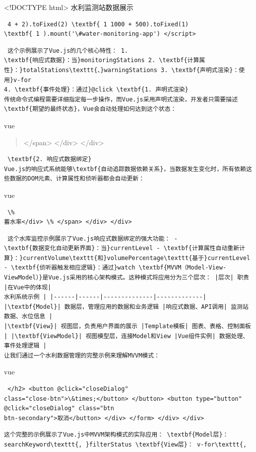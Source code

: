 \textless!DOCTYPE html\textgreater{} 水利监测站数据展示 \begin{verbatim} 4 + 2).toFixed(2) \textbf{ 1 1000 + 500).toFixed(1)
\textbf{ 1 ).mount('\#water-monitoring-app') </script> \end{verbatim} \begin{lstlisting} 这个示例展示了Vue.js的几个核心特性： 1.
\textbf{响应式数据}：当}monitoringStations 2. \textbf{计算属性}：}totalStations\texttt{、}warningStations 3. \textbf{声明式渲染}：使用}v-for
4. \textbf{事件处理}：通过}@click \textbf{1. 声明式渲染}
传统命令式编程需要详细指定每一步操作，而Vue.js采用声明式渲染，开发者只需要描述\textbf{期望的最终状态}，Vue会自动处理如何达到这个状态： \end{lstlisting} vue \begin{quote}

</span> </div> </div> 
\end{quote} \begin{lstlisting} \textbf{2. 响应式数据绑定}
Vue.js的响应式系统能够\textbf{自动追踪数据依赖关系}，当数据发生变化时，所有依赖这些数据的DOM元素、计算属性和侦听器都会自动更新： \end{lstlisting} vue \begin{verbatim} \%
蓄水率</div> \% </span> </div> </div> \end{verbatim} \begin{lstlisting} 这个水库监控示例展示了Vue.js响应式数据绑定的强大功能： -
\textbf{数据变化自动更新界面}：当}currentLevel - \textbf{计算属性自动重新计算}：}currentVolume\texttt{和}volumePercentage\texttt{基于}currentLevel
- \textbf{侦听器触发相应逻辑}：通过}watch \textbf{MVVM（Model-View-ViewModel）}是Vue.js采用的核心架构模式。这种模式将应用分为三个层次： |层次| 职责 |在Vue中的体现|
水利系统示例 | |------|------|--------------|-------------| |\textbf{Model}| 数据层，管理应用的数据和业务逻辑 |响应式数据、API调用| 监测站数据、水位信息 |
|\textbf{View}| 视图层，负责用户界面的展示 |Template模板| 图表、表格、控制面板 | |\textbf{ViewModel}| 视图模型层，连接Model和View |Vue组件实例| 数据处理、事件处理逻辑 |
让我们通过一个水利数据管理的完整示例来理解MVVM模式： \end{lstlisting} vue \begin{verbatim} </h2> <button @click="closeDialog"
class="close-btn">\&times;</button> </button> <button type="button" @click="closeDialog" class="btn
btn-secondary">取消</button> </div> </form> </div> </div> \end{verbatim} \begin{lstlisting}
这个完整的示例展示了Vue.js中MVVM架构模式的实际应用： \textbf{Model层}： searchKeyword\texttt{, }filterStatus \textbf{View层}： v-for\texttt{,

\end{lstlisting}
